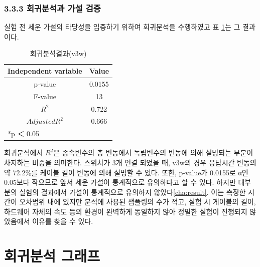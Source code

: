 \documentclass[11pt
  , a4paper
  , article
  , oneside
]{memoir}
\begin{document}
 \subsection{3.3.3 회귀분석과 가설 검증}
 실험 전 세운 가설의 타당성을 입증하기 위하여 회귀분석을 수행하였고 표 \ref{table:regression}는 그 결과이다.
 
\begin{table}[!htb]
\begin{center}
\begin{tabular}{c|c}\hline
Independent variable & Value  \\ \hline\hline
p-value &  0.0155\\ 
F-value &  13\\ 
$  R^2  $ &  0.722\\ 
$ Adjusted R^2 $ & 0.666 \\ \hline
\multicolumn{2}{l}{*p ＜ 0.05} \\ \hline\hline
\end{tabular}
\caption{회귀분석결과(v3w)}
  \label{table:regression}  
\end{center}
\end{table} 
회귀분석에서 $  R^2  $은 종속변수의 총 변동에서 독립변수의 변동에 의해 설명되는 부분이 차지하는 비중을 의미한다. 스위치가 3개 연결 되었을 때, v3w의 경우 응답시간 변동의 약 72.2\%를 케이블 길이 변동에 의해 설명할 수 있다. 또한, p-value가 0.0155로 α인 0.05보다 작으므로 앞서 세운 가설이 통계적으로 유의하다고 할 수 있다. 하지만 대부분의 실험의 결과에서 가설이 통계적으로 유의하지 않았다\ref{cha:result}. 이는 측정한 시간이 오차범위 내에 있지만 분석에 사용된 샘플링의 수가 적고, 실험 시 게이블의 길이, 하드웨어 자체의 속도 등의 환경이 완벽하게 동일하지 않아 정밀한 실험이 진행되지 않았음에서 이유를 찾을 수 있다. 

\clearpage
\appendix
\addappheadtotoc
\renewcommand*\printchaptername{\Large\bfseries\appendixname~}
\chapter{회귀분석 그래프}
\end{document}
